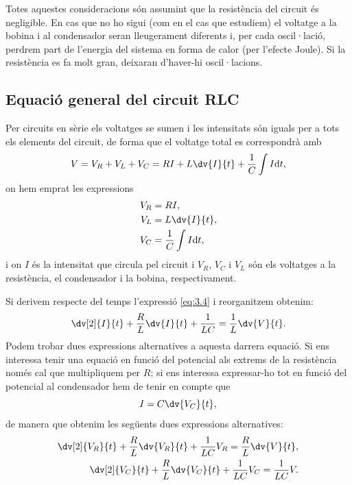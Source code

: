 \documentclass[a4paper,10.5pt]{report}
\begin{document}
Totes aquestes consideracions són assumint que la resistència del circuit és negligible. En cas que no ho sigui (com en el cas que estudiem) el voltatge a la bobina i al condensador seran lleugerament diferents i, per cada oscil·lació, perdrem part de l'energia del sistema en forma de calor (per l'efecte Joule). Si la resistència es fa molt gran, deixaran d'haver-hi oscil·lacions.

\subsection{Equació general del circuit RLC}
Per circuits en sèrie els voltatges se sumen i les intensitats són iguals per a tots els elements del circuit, de forma que el voltatge total es correspondrà amb
\begin{equation}
	V = V_R + V_L + V_C = RI + L \dv{I}{t} + \frac{1}{C} \int I\mathrm{d}t, \label{eq:3.4}
\end{equation}
on hem emprat les expressions 
\begin{align}
	V_R & = RI, \\
	V_L & = L \dv{I}{t}, \\
	V_C & = \frac{1}{C} \int I \mathrm{d}t,
\end{align}
i on $I$ és la intensitat que circula pel circuit i $V_R$, $V_C$ i $V_L$ són els voltatges a la resistència, el condensador i la bobina, respectivament. 

Si derivem respecte del temps l'expressió \eqref{eq:3.4} i reorganitzem obtenim:
\begin{equation}
	\dv[2]{I}{t} + \frac{R}{L} \dv{I}{t}+\frac{1}{LC} = \frac{1}{L}\dv{V}{t}.\label{eq:3.8}
\end{equation}
Podem trobar dues expressions alternatives a aquesta darrera equació. Si ens interessa tenir una equació en funció del potencial als extrems de la resistència només cal que multipliquem per $R$; si ens interessa expressar-ho tot en funció del potencial al condensador hem de tenir en compte que
\begin{equation}
	I = C \dv{V_C}{t},
\end{equation}
de manera que obtenim les següents dues expressions alternatives:
\begin{align}
	\dv[2]{V_R}{t} + \frac{R}{L}\dv{V_R}{t} + \frac{1}{LC}V_R = \frac{R}{L} \dv{V}{t}, \\
	\dv[2]{V_C}{t} + \frac{R}{L}\dv{V_C}{t} + \frac{1}{LC}V_C=\frac{1}{LC}V. \label{eq:3.11}
\end{align}
\end{document}
